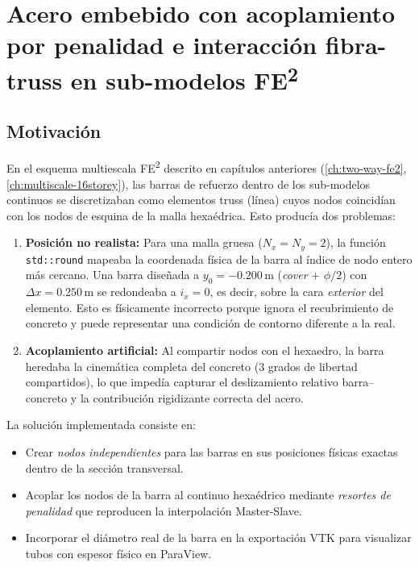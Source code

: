 
\chapter{Acero embebido con acoplamiento por penalidad e interacción
         fibra-truss en sub-modelos FE\textsuperscript{2}}
\label{ch:embedded-rebar}

\section{Motivación}
\label{sec:emb-motivation}

En el esquema multiescala FE\textsuperscript{2} descrito en capítulos
anteriores (\ref{ch:two-way-fe2}, \ref{ch:multiscale-16storey}),
las barras de refuerzo dentro de los sub-modelos continuos se
discretizaban como elementos truss (línea) cuyos nodos coincidían con
los nodos de esquina de la malla hexaédrica.  Esto producía dos
problemas:

\begin{enumerate}
  \item \textbf{Posición no realista:}
        Para una malla gruesa ($N_x = N_y = 2$), la función
        \texttt{std::round} mapeaba la coordenada física de la barra
        al índice de nodo entero más cercano.  Una barra diseñada a
        $y_0 = -0{.}200$\,m (\textit{cover} + $\phi/2$) con
        $\Delta x = 0{.}250$\,m se redondeaba a $i_x = 0$, es decir,
        sobre la cara \emph{exterior} del elemento.  Esto es
        físicamente incorrecto porque ignora el recubrimiento de
        concreto y puede representar una condición de contorno
        diferente a la real.

  \item \textbf{Acoplamiento artificial:}
        Al compartir nodos con el hexaedro, la barra heredaba la
        cinemática completa del concreto (3 grados de libertad
        compartidos), lo que impedía capturar el deslizamiento relativo
        barra--concreto y la contribución rigidizante correcta del
        acero.
\end{enumerate}

La solución implementada consiste en:
\begin{itemize}
  \item Crear \emph{nodos independientes} para las barras en sus
        posiciones físicas exactas dentro de la sección transversal.
  \item Acoplar los nodos de la barra al continuo hexaédrico mediante
        \emph{resortes de penalidad} que reproducen la interpolación
        Master-Slave.
  \item Incorporar el diámetro real de la barra en la exportación VTK
        para visualizar tubos con espesor físico en ParaView.
\end{itemize}



